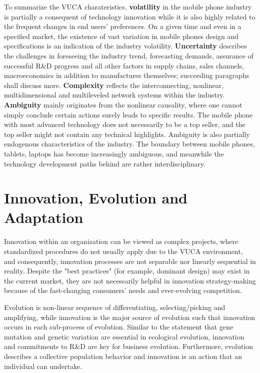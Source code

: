 \documentclass[utf8,english]{gradu3}
\begin{document}
To summarize the VUCA charateristics, \textbf{volatility} in the mobile phone industry is partially a consequent of technology innovation while it is also highly related to the frequent changes in end users’ preferences. On a given time and even in a specified market, the existence of vast variation in mobile phones design and specifications is an indication of the industry volatility. \textbf{Uncertainty} describes the challenges in foreseeing the industry trend, forecasting demands, assurance of successful R\&D progress and all other factors in supply chains, sales channels, macroeconomics in addition to manufactures themselves; succeeding paragraphs shall discuss more. \textbf{Complexity} reflects the interconnecting, nonlinear, multidimensional and multileveled network systems within the industry. \textbf{Ambiguity} mainly originates from the nonlinear causality, where one cannot simply conclude certain actions surely leads to specific results. The mobile phone with most advanced technology does not necessarily to be a top seller, and the top seller might not contain any technical highlights. Ambiguity is also partially endogenous characteristics of the industry. The boundary between mobile phones, tablets, laptops has become increasingly ambiguous, and meanwhile the technology development paths behind are rather interdisciplinary.

\section{Innovation, Evolution and Adaptation}

Innovation within an organization can be viewed as complex projects, where standardized  procedures do not usually apply due to the VUCA environment, and consequently, innovation processes are not separable nor linearly sequential in reality. Despite the "best practices" (for example, dominant design) may exist in the current market, they are not necessarily helpful in innovation strategy-making because of the fast-changing consumers' needs and ever-evolving competition. 

Evolution is non-linear sequence of differentiating, selecting/picking and amplifying, while innovation is the major source of evolution such that innovation occurs in each sub-process of evolution. Similar to the statement that gene mutation and genetic variation are essential in ecological evolution, innovation and commitments to R\&D are key for business evolution. Furthermore, evolution describes a collective population behavior and innovation is an action that an individual can undertake.
\end{document}
